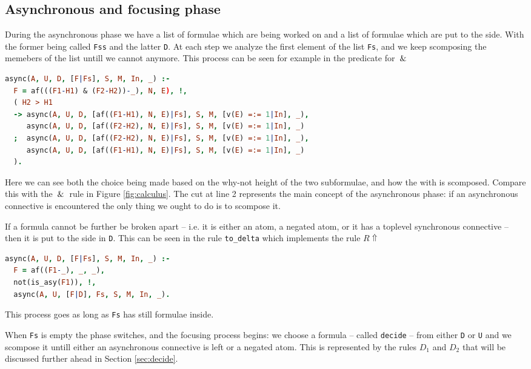\documentclass[a4paper, 12pt, tesi, english]{report}
\begin{document}
\subsection{Asynchronous and focusing phase}
During the asynchronous phase we have a list of formulae which are being worked on and a list of formulae which are put to the side.
With the former being called \texttt{Fss} and the latter \texttt{D}.
At each step we analyze the first element of the list \texttt{Fs}, and we keep scomposing the memebers of the list untill we cannot anymore.
This process can be seen for example in the predicate for $\:\&\:$
\begin{lstlisting}[language=prolog]
async(A, U, D, [F|Fs], S, M, In, _) :-
  F = af(((F1-H1) & (F2-H2))-_), N, E), !,
  ( H2 > H1	
  -> async(A, U, D, [af((F1-H1), N, E)|Fs], S, M, [v(E) =:= 1|In], _), 
     async(A, U, D, [af((F2-H2), N, E)|Fs], S, M, [v(E) =:= 1|In], _) 
  ;  async(A, U, D, [af((F2-H2), N, E)|Fs], S, M, [v(E) =:= 1|In], _),
     async(A, U, D, [af((F1-H1), N, E)|Fs], S, M, [v(E) =:= 1|In], _)
  ).
\end{lstlisting}
Here we can see both the choice being made based on the why-not height of the two subformulae, and how the with is scomposed.
Compare this with the $\:\&\:$ rule in Figure \ref{fig:calculus}.
The cut at line 2 represents the main concept of the asynchronous phase: if an asynchronous connective is encountered the only thing we ought to do is to scompose it.

If a formula cannot be further be broken apart -- i.e. it is either an atom, a negated atom, or it has a toplevel synchronous connective -- then it is put to the side in \texttt{D}.
This can be seen in the rule \texttt{to\_delta} which implements the rule $R\!\Uparrow$
\begin{lstlisting}[language=prolog]
async(A, U, D, [F|Fs], S, M, In, _) :-
  F = af((F1-_), _, _),
  not(is_asy(F1)), !,
  async(A, U, [F|D], Fs, S, M, In, _).
\end{lstlisting}
This process goes as long as \texttt{Fs} has still formulae inside.

When \texttt{Fs} is empty the phase switches, and the focusing process begins: we choose a formula -- called \texttt{decide} -- from either \texttt{D} or \texttt{U} and we scompose it untill either an asynchronous connective is left or a negated atom.
This is represented by the rules $D_1$ and $D_2$ that will be discussed further ahead in Section \ref{sec:decide}.
\end{document}

